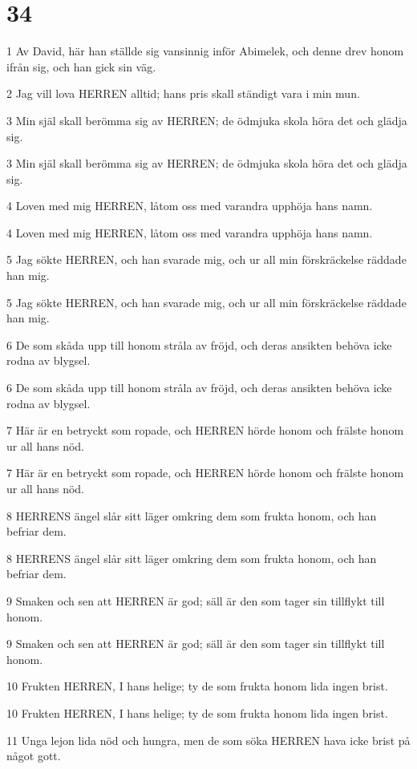 \chapter{34}

\par 1 Av David, här han ställde sig vansinnig inför Abimelek, och denne drev honom ifrån sig, och han gick sin väg.
\par 2 Jag vill lova HERREN alltid; hans pris skall ständigt vara i min mun.
\par 3 Min själ skall berömma sig av HERREN; de ödmjuka skola höra det och glädja sig.
\par 3 Min själ skall berömma sig av HERREN; de ödmjuka skola höra det och glädja sig.
\par 4 Loven med mig HERREN, låtom oss med varandra upphöja hans namn.
\par 4 Loven med mig HERREN, låtom oss med varandra upphöja hans namn.
\par 5 Jag sökte HERREN, och han svarade mig, och ur all min förskräckelse räddade han mig.
\par 5 Jag sökte HERREN, och han svarade mig, och ur all min förskräckelse räddade han mig.
\par 6 De som skåda upp till honom stråla av fröjd, och deras ansikten behöva icke rodna av blygsel.
\par 6 De som skåda upp till honom stråla av fröjd, och deras ansikten behöva icke rodna av blygsel.
\par 7 Här är en betryckt som ropade, och HERREN hörde honom och frälste honom ur all hans nöd.
\par 7 Här är en betryckt som ropade, och HERREN hörde honom och frälste honom ur all hans nöd.
\par 8 HERRENS ängel slår sitt läger omkring dem som frukta honom, och han befriar dem.
\par 8 HERRENS ängel slår sitt läger omkring dem som frukta honom, och han befriar dem.
\par 9 Smaken och sen att HERREN är god; säll är den som tager sin tillflykt till honom.
\par 9 Smaken och sen att HERREN är god; säll är den som tager sin tillflykt till honom.
\par 10 Frukten HERREN, I hans helige; ty de som frukta honom lida ingen brist.
\par 10 Frukten HERREN, I hans helige; ty de som frukta honom lida ingen brist.
\par 11 Unga lejon lida nöd och hungra, men de som söka HERREN hava icke brist på något gott.
